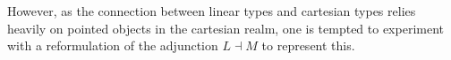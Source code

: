 However, as the connection between linear types and cartesian types relies heavily on pointed objects in the cartesian realm, one is tempted to experiment with a reformulation of the adjunction $L \dashv M$ to represent this.


\begin{comment}
weaken the pointed category $\mathcal{C}_*$ by making morphisms into triangles:
\[
 \ti
  1 \ar[d, "a"] \ar[dr, "b", name=C] & \\
  A \ar[r, "f", name=A,swap]& B \ar[from=A, to=C, symbol=\implies,yshift=-45, xshift=8, "\alpha"]
  \kz
\]
now only commuting up to a 2-cell $\alpha : f\circ a \implies b$.


In the groupoid model, this corresponds to
we might want to weaken the commutativity of morphisms above. That is, we want linear types to be specified by pointed cartesian types,
\end{comment}
\nocite{benton1995mixed}
\nocite{hofmann1997syntax}


